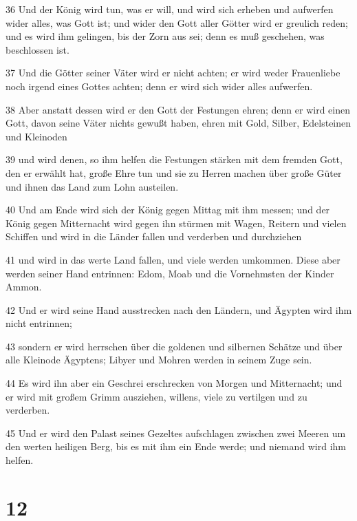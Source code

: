 \par 36 Und der König wird tun, was er will, und wird sich erheben und aufwerfen wider alles, was Gott ist; und wider den Gott aller Götter wird er greulich reden; und es wird ihm gelingen, bis der Zorn aus sei; denn es muß geschehen, was beschlossen ist.
\par 37 Und die Götter seiner Väter wird er nicht achten; er wird weder Frauenliebe noch irgend eines Gottes achten; denn er wird sich wider alles aufwerfen.
\par 38 Aber anstatt dessen wird er den Gott der Festungen ehren; denn er wird einen Gott, davon seine Väter nichts gewußt haben, ehren mit Gold, Silber, Edelsteinen und Kleinoden
\par 39 und wird denen, so ihm helfen die Festungen stärken mit dem fremden Gott, den er erwählt hat, große Ehre tun und sie zu Herren machen über große Güter und ihnen das Land zum Lohn austeilen.
\par 40 Und am Ende wird sich der König gegen Mittag mit ihm messen; und der König gegen Mitternacht wird gegen ihn stürmen mit Wagen, Reitern und vielen Schiffen und wird in die Länder fallen und verderben und durchziehen
\par 41 und wird in das werte Land fallen, und viele werden umkommen. Diese aber werden seiner Hand entrinnen: Edom, Moab und die Vornehmsten der Kinder Ammon.
\par 42 Und er wird seine Hand ausstrecken nach den Ländern, und Ägypten wird ihm nicht entrinnen;
\par 43 sondern er wird herrschen über die goldenen und silbernen Schätze und über alle Kleinode Ägyptens; Libyer und Mohren werden in seinem Zuge sein.
\par 44 Es wird ihn aber ein Geschrei erschrecken von Morgen und Mitternacht; und er wird mit großem Grimm ausziehen, willens, viele zu vertilgen und zu verderben.
\par 45 Und er wird den Palast seines Gezeltes aufschlagen zwischen zwei Meeren um den werten heiligen Berg, bis es mit ihm ein Ende werde; und niemand wird ihm helfen.

\chapter{12}

